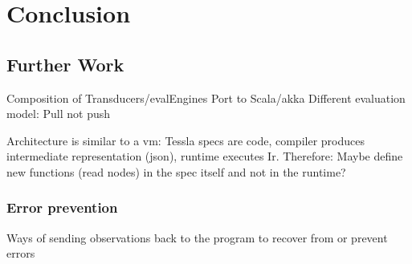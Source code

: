 %
\chapter{Conclusion}
\label{sec:conclusion}

\section{Further Work}
\label{sec:conclusion:further_work}

Composition of Transducers/evalEngines
Port to Scala/akka
Different evaluation model: Pull not push

Architecture is similar to a vm: Tessla specs are code, compiler produces intermediate representation (json), runtime executes Ir.
Therefore: Maybe define new functions (read nodes) in the spec itself and not in the runtime?

\subsection{Error prevention}
\label{sec:conclusion:further_work:error_prevention}
Ways of sending observations back to the program to recover from or prevent errors

